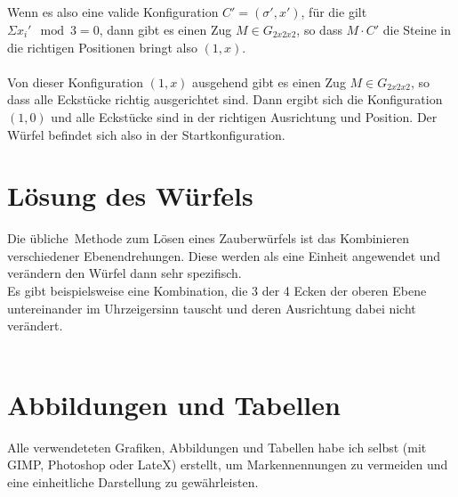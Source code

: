 \documentclass[12pt,a4paper, usenames, dvipsnames]{article}
\begin{document}
\ \\ \\ \\ \\
Wenn es also eine valide Konfiguration $C'=(\sigma', x')$, für die gilt $\Sigma x_i' \mod 3 = 0$, dann gibt es einen Zug $M \in G_{2x2x2}$, so dass $M \cdot C'$ die Steine in die richtigen Positionen bringt also $(1,x)$. \\
\\
Von dieser Konfiguration $(1,x)$ ausgehend gibt es einen Zug $M \in G_{2x2x2}$, so dass alle Eckstücke richtig ausgerichtet sind. Dann ergibt sich die Konfiguration $(1, 0)$ und alle Eckstücke sind in der richtigen Ausrichtung und Position. Der Würfel befindet sich also in der Startkonfiguration. \\ 






















\newpage


\section{Lösung des Würfels}

Die \glqq übliche\grqq \  Methode zum Lösen eines Zauberwürfels ist das Kombinieren verschiedener Ebenendrehungen. Diese werden als eine Einheit angewendet und verändern den Würfel dann sehr spezifisch. \\
Es gibt beispielsweise eine Kombination, die 3 der 4 Ecken der oberen Ebene untereinander im Uhrzeigersinn tauscht und deren Ausrichtung dabei nicht verändert. \\
\\




























\newpage



\section{Abbildungen und Tabellen}

Alle verwendeteten Grafiken, Abbildungen und Tabellen habe ich selbst (mit GIMP, Photoshop oder LateX) erstellt, um Markennennungen zu vermeiden und eine einheitliche Darstellung zu gewährleisten.



\printbibliography
\end{document}
